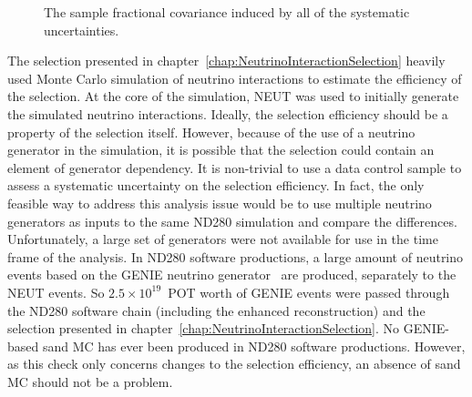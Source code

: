 \begin{figure}%
  \centering
  \caption{The sample fractional covariance induced by all of the systematic uncertainties.}
  \label{fig:TotalCovarianceMatrices}
\end{figure}
\newline
\newline
The selection presented in chapter~\ref{chap:NeutrinoInteractionSelection} heavily used Monte Carlo simulation of neutrino interactions to estimate the efficiency of the selection.  At the core of the simulation, NEUT was used to initially generate the simulated neutrino interactions.  Ideally, the selection efficiency should be a property of the selection itself.  However, because of the use of a neutrino generator in the simulation, it is possible that the selection could contain an element of generator dependency.  It is non-trivial to use a data control sample to assess a systematic uncertainty on the selection efficiency.  In fact, the only feasible way to address this analysis issue would be to use multiple neutrino generators as inputs to the same ND280 simulation and compare the differences.  Unfortunately, a large set of generators were not available for use in the time frame of the analysis.  In ND280 software productions, a large amount of neutrino events based on the GENIE neutrino generator~\cite{Andreopoulos201087} are produced, separately to the NEUT events.  So $2.5\times 10^{19}$~POT worth of GENIE events were passed through the ND280 software chain (including the enhanced reconstruction) and the selection presented in chapter~\ref{chap:NeutrinoInteractionSelection}.  No GENIE-based sand MC has ever been produced in ND280 software productions.  However, as this check only concerns changes to the selection efficiency, an absence of sand MC should not be a problem.  
